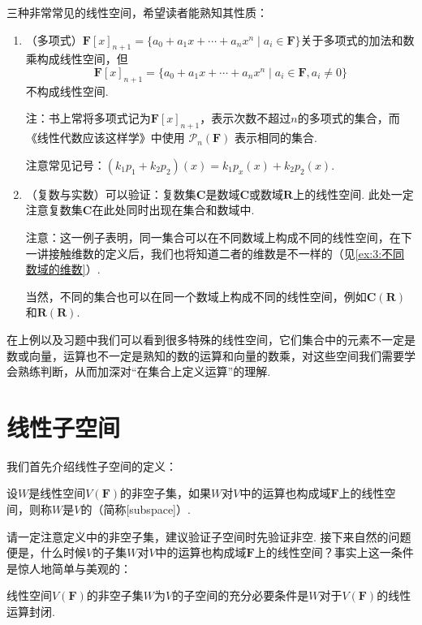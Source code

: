 \begin{example}
    三种非常常见的线性空间，希望读者能熟知其性质：
    \begin{enumerate}
        \item （多项式）$\mathbf{F}[x]_{n+1}=\{a_0+a_1x+\cdots+a_nx^n \mid a_i\in\mathbf{F}\}$关于多项式的加法和数乘构成线性空间，但
              \[\mathbf{F}[x]_{n+1}=\{a_0+a_1x+\cdots+a_nx^n \mid a_i\in\mathbf{F},a_i\neq 0\}\]
              不构成线性空间.

              注：书上常将多项式记为$\mathbf{F}[x]_{n+1}$，表示次数不超过$n$的多项式的集合，而《线性代数应该这样学》中使用 $\mathcal{P}_n(\mathbf{F})$ 表示相同的集合.

              注意常见记号：$(k_1p_1+k_2p_2)(x)=k_1p_x(x)+k_2p_2(x)$.

        \item （复数与实数）可以验证：复数集$\mathbf{C}$是数域$\mathbf{C}$或数域$\mathbf{R}$上的线性空间. 此处一定注意复数集$\mathbf{C}$在此处同时出现在集合和数域中.

              注意：这一例子表明，同一集合可以在不同数域上构成不同的线性空间，在下一讲接触维数的定义后，我们也将知道二者的维数是不一样的（见\autoref{ex:3:不同数域的维数}）.

              当然，不同的集合也可以在同一个数域上构成不同的线性空间，例如$\mathbf{C(R)}$和$\mathbf{R(R)}$.
    \end{enumerate}
\end{example}

在上例以及习题中我们可以看到很多特殊的线性空间，它们集合中的元素不一定是数或向量，运算也不一定是熟知的数的运算和向量的数乘，对这些空间我们需要学会熟练判断，从而加深对``在集合上定义运算''的理解.

\section{线性子空间}

我们首先介绍线性子空间的定义：
\begin{definition}
    设$W$是线性空间$V(\mathbf{F})$的非空子集，如果$W$对$V$中的运算也构成域$\mathbf{F}$上的线性空间，则称$W$是$V$的（简称[subspace]）.
\end{definition}

请一定注意定义中的非空子集，建议验证子空间时先验证非空. 接下来自然的问题便是，什么时候$V$的子集$W$对$V$中的运算也构成域$\mathbf{F}$上的线性空间？事实上这一条件是惊人地简单与美观的：
\begin{theorem}\label{thm:2:子空间判别}
    线性空间$V(\mathbf{F})$的非空子集$W$为$V$的子空间的充分必要条件是$W$对于$V(\mathbf{F})$的线性运算封闭.
\end{theorem}

